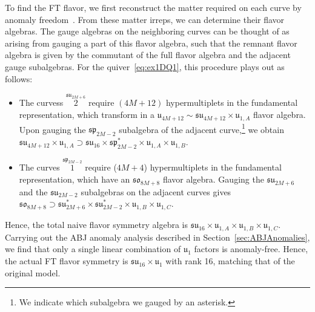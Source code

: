 \documentclass[11pt]{article}
\numberwithin{equation}{section}
\newcommand{\fu}{\mathfrak{u}}
\begin{document}
To find the FT flavor, we first reconstruct the matter required on each curve by anomaly freedom~\cite{Johnson:2016qar}. From these matter irreps, we can determine their flavor algebras. The gauge algebras on the neighboring curves can be thought of as arising from gauging a part of this flavor algebra, such that the remnant flavor algebra is given by the commutant of the full flavor algebra and the adjacent gauge subalgebras. For the quiver~\eqref{eq:ex1DQ1}, this procedure plays out as follows:
\begin{itemize}
    \item The curvess ${\overset{\mathfrak{su}_{2M+6}}{2}}$ require $ (4M+12)$ hypermultiplets in the fundamental representation, which transform in a $\mathfrak{u}_{4M+12} \sim \mathfrak{su}_{4M+12} \times \mathfrak{u}_{1,A}$ flavor algebra. Upon gauging the $\mathfrak{sp}_{2M-2}$ subalgebra of the adjacent curve,\footnote{We indicate which subalgebra we gauged by an asterisk.} we obtain $\mathfrak{su}_{4M+12} \times \mathfrak{u}_{1,A}\supset\mathfrak{su}_{16} \times \mathfrak{sp}_{2M-2}^{*} \times \mathfrak{u}_{1,A} \times \mathfrak{u}_{1,B}$.
    \item The curves ${\overset{\mathfrak{sp}_{2M-2}}{1}}$ require ($4M+4$) hypermultiplets in the fundamental representation, which have an $\mathfrak{so}_{8M+8}$ flavor algebra. Gauging the $\mathfrak{su}_{2M+6}$ and the $\mathfrak{su}_{2M-2}$ subalgebras on the adjacent curves gives $\mathfrak{so}_{8M+8}\supset\mathfrak{su}_{2M+6}^{*} \times \mathfrak{su}_{2M-2}^{*} \times \mathfrak{u}_{1,B}  \times \mathfrak{u}_{1,C} $.
\end{itemize}
Hence, the total naive flavor symmetry algebra is $\mathfrak{su}_{16} \times  \mathfrak{u}_{1,A}  \times \mathfrak{u}_{1,B}  \times \mathfrak{u}_{1,C} $. Carrying out the ABJ anomaly analysis described in Section~\ref{sec:ABJAnomalies}, we find that only a single linear combination of $\fu_1$ factors is anomaly-free. Hence, the actual FT flavor symmetry is $\mathfrak{su}_{16} \times \mathfrak{u}_{1}$ with rank 16, matching that of the original model.
\end{document}
